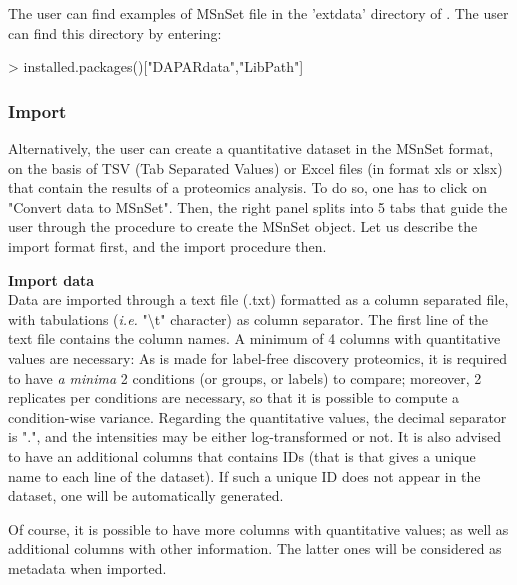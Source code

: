 \documentclass[12pt]{article}
\begin{document}
{The user can find examples of MSnSet file in the 'extdata' directory 
of . The user can find this directory by entering:\newline

\begin{Schunk}
\begin{Sinput}
> installed.packages()["DAPARdata","LibPath"]
\end{Sinput}
\end{Schunk}


% 


\subsubsection{Import}\label{sec:import}
Alternatively, the user can create a quantitative dataset in the MSnSet 
format, on the basis of TSV (Tab Separated Values) or Excel files (in format 
xls or xlsx) that contain the results of a proteomics analysis. To do so, one 
has to click on "Convert data to MSnSet". Then, the right panel splits into 5 
tabs that guide the user through the procedure to create the MSnSet object. 
Let us describe the import format first, and the import procedure then. 

\noindent \textbf{Import data}\\
\noindent Data are imported through a text file (.txt) formatted as a column 
separated file, with tabulations (\textit{i.e.} "\textbackslash{}t" character) 
as column separator.
The first line of the text file contains the column names. A minimum of 4 
columns with quantitative values are necessary: As  is made 
for label-free discovery proteomics, it is required to have \textit{a minima} 
2 conditions (or groups, or labels) to compare; moreover, 2 replicates per 
conditions are necessary, so that it is possible to compute a condition-wise 
variance. Regarding the quantitative values, the decimal separator is ".", 
and the intensities may be either log-transformed or not. It is also advised 
to have an additional columns that contains IDs (that is that gives a unique 
name to each line of the dataset). If such a unique ID does not appear in the 
dataset, one will be automatically generated.

Of course, it is possible to have more columns with quantitative values; as 
well as additional columns with other information. The latter ones will be 
considered as metadata when imported.

}
\end{document}
